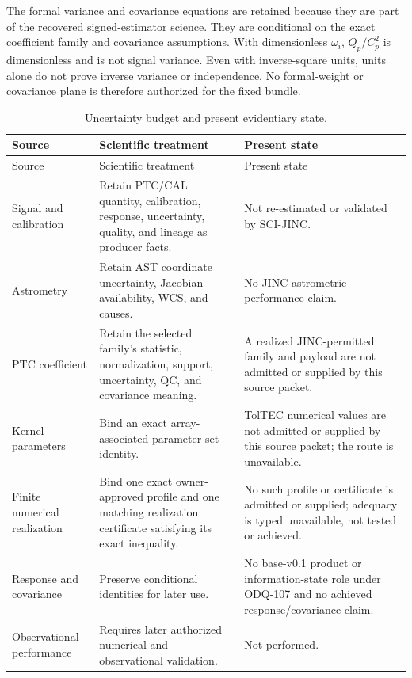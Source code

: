 \documentclass[11pt]{article}
\begin{document}
The formal variance and covariance equations are retained because they are
part of the recovered signed-estimator science.  They are conditional on the
exact coefficient family and covariance assumptions.  With dimensionless
$\omega_i$, $Q_p/C_p^2$ is dimensionless and is not signal variance.  Even
with inverse-square units, units alone do not prove inverse variance or
independence.  No formal-weight or covariance plane is therefore authorized
for the fixed bundle.

\begin{longtable}{@{}>{\raggedright\arraybackslash}p{}
                        >{\raggedright\arraybackslash}p{}
                        >{\raggedright\arraybackslash}p{}@{}}
\caption{Uncertainty budget and present evidentiary state.}\label{tab:uncertainty}\\
\toprule
Source & Scientific treatment & Present state \\
\midrule
\endfirsthead
\toprule
Source & Scientific treatment & Present state \\
\midrule
\endhead
Signal and calibration & Retain PTC/CAL quantity, calibration, response,
uncertainty, quality, and lineage as producer facts. & Not re-estimated or
validated by SCI-JINC. \\
Astrometry & Retain AST coordinate uncertainty, Jacobian availability, WCS,
and causes. & No JINC astrometric performance claim. \\
PTC coefficient & Retain the selected family's statistic, normalization,
support, uncertainty, QC, and covariance meaning. & A realized JINC-permitted
family and payload are not admitted or supplied by this source packet. \\
Kernel parameters & Bind an exact array-associated parameter-set identity. &
TolTEC numerical values are not admitted or supplied by this source packet;
the route is unavailable. \\
Finite numerical realization & Bind one exact owner-approved profile and one
matching realization certificate satisfying its exact inequality. & No such
profile or certificate is admitted or supplied; adequacy is typed unavailable,
not tested or achieved. \\
Response and covariance & Preserve conditional identities for later use. & No
base-v0.1 product or information-state role under ODQ-107 and no achieved
response/covariance claim. \\
Observational performance & Requires later authorized numerical and
observational validation. & Not performed. \\
\bottomrule
\end{longtable}
\end{document}
